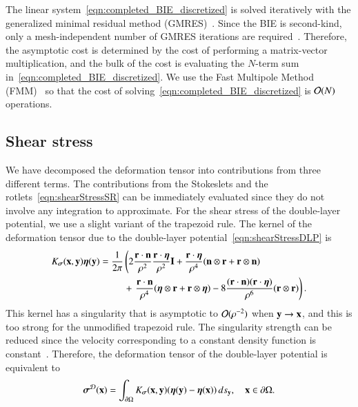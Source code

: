 \documentclass[preprint, 10pt]{elsarticle}
\begin{document}
The linear system~\eqref{eqn:completed_BIE_discretized} is solved
iteratively with the generalized minimal residual method
(GMRES)~\cite{saa-sch1986}.  Since the BIE is second-kind, only a
mesh-independent number of GMRES iterations are
required~\cite{cam-ips-kel-mey-xue1996}.  Therefore, the asymptotic cost
is determined by the cost of performing a matrix-vector multiplication,
and the bulk of the cost is evaluating the $N$-term sum
in~\eqref{eqn:completed_BIE_discretized}. We use the Fast Multipole
Method (FMM)~\cite{gre-rok1987, gre-gre-may1992} so that the cost of
solving~\eqref{eqn:completed_BIE_discretized} is ${\mathcal{O}}(N)$ operations.


\subsection{Shear stress}
\label{sec:shearStress}
We have decomposed the deformation tensor into contributions from three
different terms.  The contributions from the Stokeslets and the
rotlets~\eqref{eqn:shearStressSR} can be immediately evaluated since
they do not involve any integration to approximate.  For the shear
stress of the double-layer potential, we use a slight variant of the
trapezoid rule. The kernel of the deformation tensor due to the
double-layer potential~\eqref{eqn:shearStressDLP} is 
\begin{align*}
  K_{\boldsymbol\sigma}({\mathbf{x}},{\mathbf{y}}){\boldsymbol\eta}({\mathbf{y}}) &= \frac{1}{2\pi} \left(
    2\frac{{\mathbf{r}} \cdot {\mathbf{n}}}{\rho^2} \frac{{\mathbf{r}} \cdot {\boldsymbol\eta}}{\rho^2} {\mathbf{I}} + 
    \frac{{\mathbf{r}} \cdot {\boldsymbol\eta}}{\rho^4} ({\mathbf{n}} \otimes {\mathbf{r}} + {\mathbf{r}} \otimes {\mathbf{n}})
    \right. \\ & \hspace{25pt}+ \left.
    \frac{{\mathbf{r}} \cdot {\mathbf{n}}}{\rho^4} ({\boldsymbol\eta} \otimes {\mathbf{r}} + {\mathbf{r}} \otimes {\boldsymbol\eta}) - 
    8\frac{({\mathbf{r}} \cdot {\mathbf{n}})({\mathbf{r}} \cdot {\boldsymbol\eta})}{\rho^6}({\mathbf{r}} \otimes {\mathbf{r}})
  \right).
\end{align*}
This kernel has a singularity that is asymptotic to ${\mathcal{O}}(\rho^{-2})$
when ${\mathbf{y}} \rightarrow {\mathbf{x}}$, and this is too strong for the unmodified
trapezoid rule.  The singularity strength can be reduced since the
velocity corresponding to a constant density function is
constant~\cite{poz1992}.  Therefore, the deformation tensor of the
double-layer potential is equivalent to
\begin{align*}
  {\boldsymbol\sigma}^{{\mathcal{D}}}({\mathbf{x}}) = \int_{{\partial}\Omega}K_{\boldsymbol\sigma}({\mathbf{x}},{\mathbf{y}})
      ({\boldsymbol\eta}({\mathbf{y}}) - {\boldsymbol\eta}({\mathbf{x}})) \, ds_{{\mathbf{y}}}, \quad {\mathbf{x}} \in {\partial}\Omega.
\end{align*}
\end{document}
